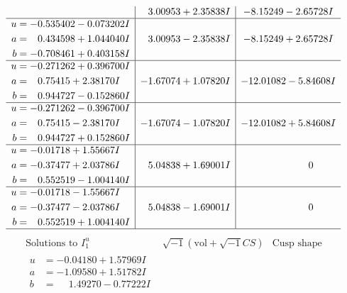 \documentclass[1p]{elsarticle_modified}
\theoremstyle{definition}
\newcommand{\I}{\sqrt{-1}}
\begin{document}
$$\begin{array}{c|c|c}
 & \phantom{-}3.00953 + 2.35838 I & -8.15249 - 2.65728 I \\ \hline\begin{aligned}
u &= -0.535402 - 0.073202 I \\
a &= \phantom{-}0.434598 + 1.044040 I \\
b &= -0.708461 + 0.403158 I\end{aligned}
 & \phantom{-}3.00953 - 2.35838 I & -8.15249 + 2.65728 I \\ \hline\begin{aligned}
u &= -0.271262 + 0.396700 I \\
a &= \phantom{-}0.75415 + 2.38170 I \\
b &= \phantom{-}0.944727 - 0.152860 I\end{aligned}
 & -1.67074 + 1.07820 I & -12.01082 - 5.84608 I \\ \hline\begin{aligned}
u &= -0.271262 - 0.396700 I \\
a &= \phantom{-}0.75415 - 2.38170 I \\
b &= \phantom{-}0.944727 + 0.152860 I\end{aligned}
 & -1.67074 - 1.07820 I & -12.01082 + 5.84608 I \\ \hline\begin{aligned}
u &= -0.01718 + 1.55667 I \\
a &= -0.37477 + 2.03786 I \\
b &= \phantom{-}0.552519 - 1.004140 I\end{aligned}
 & \phantom{-}5.04838 + 1.69001 I & \phantom{-0.000000 } 0 \\ \hline\begin{aligned}
u &= -0.01718 - 1.55667 I \\
a &= -0.37477 - 2.03786 I \\
b &= \phantom{-}0.552519 + 1.004140 I\end{aligned}
 & \phantom{-}5.04838 - 1.69001 I & \phantom{-0.000000 } 0\\
 \hline 
 \end{array}$$\newpage$$\begin{array}{c|c|c}  
\text{Solutions to }I^u_{1}& \I (\text{vol} + \sqrt{-1}CS) & \text{Cusp shape}\\
 \hline 
\begin{aligned}
u &= -0.04180 + 1.57969 I \\
a &= -1.09580 + 1.51782 I \\
b &= \phantom{-}1.49270 - 0.77222 I\end{aligned}

\end{array}$$
\end{document}
